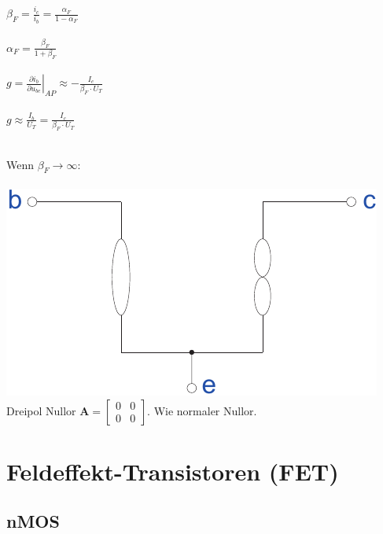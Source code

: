 \documentclass[a4paper,twocolumn,10pt]{article}
\begin{document}
\begin{minipage}[t]{0.23\textwidth}
$\beta_F=\frac{i_c}{i_b}=\frac{\alpha_F}{1-\alpha_F}$\\\\
$\alpha_F=\frac{\beta_F}{1+\beta_F}$\\\\
$g=\left.\frac{\partial i_b}{\partial u_{be}}\right|_{AP}\approx -\frac{I_e}{\beta_F\cdot U_T}$\\\\
$g\approx \frac{I_b}{U_T}=\frac{I_c}{\beta_F\cdot U_T}$\\\\
\end{minipage}
\hfill
\begin{minipage}[t]{0.23\textwidth}
Wenn $\beta_F \rightarrow \infty$:\\\\
\includegraphics[width=\textwidth]{Grafiken/Nullormodell}
Dreipol Nullor $\textbf{A}=\begin{bmatrix}0 & 0\\ 0 & 0\end{bmatrix}$. Wie normaler Nullor.
\end{minipage}

\section*{Feldeffekt-Transistoren (FET)}
\subsection*{nMOS}
\end{document}
